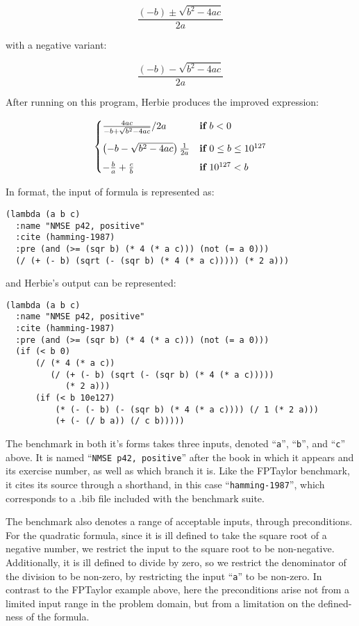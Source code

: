 \documentclass[main.tex]{subfiles}
\begin{document}
\begin{equation}
  \frac{(- b) \pm \sqrt{b^2 - 4ac}}{2a}
\end{equation}

with a negative variant:

\begin{equation}
  \frac{(- b) - \sqrt{b^2 - 4ac}}{2a}
\end{equation}

After running on this program, Herbie produces the improved
expression:

\newcommand{\K}[1]{\ensuremath{\mathbf{#1}}\relax\ifmmode\:\else\fi}

\[
\begin{cases}
  \frac{4ac}{-b + \sqrt{b^2 - 4ac}}/2a & \K{if} b < 0 \\[9pt]
  \left(-b - \sqrt{b^2 - 4ac}\right)\frac1{2a} & \K{if} 0 \le b \le 10^{127} \\[5pt]
  -\frac{b}{a} + \frac{c}{b} & \K{if} 10^{127} < b
\end{cases}
\]

In \core format, the input of formula is represented as:

\begin{verbatim}
(lambda (a b c)
  :name "NMSE p42, positive"
  :cite (hamming-1987)
  :pre (and (>= (sqr b) (* 4 (* a c))) (not (= a 0)))
  (/ (+ (- b) (sqrt (- (sqr b) (* 4 (* a c))))) (* 2 a)))
\end{verbatim}

and Herbie's output can be represented:

\begin{verbatim}
(lambda (a b c)
  :name "NMSE p42, positive"
  :cite (hamming-1987)
  :pre (and (>= (sqr b) (* 4 (* a c))) (not (= a 0)))
  (if (< b 0)
      (/ (* 4 (* a c))
         (/ (+ (- b) (sqrt (- (sqr b) (* 4 (* a c)))))
            (* 2 a)))
      (if (< b 10e127)
          (* (- (- b) (- (sqr b) (* 4 (* a c)))) (/ 1 (* 2 a)))
          (+ (- (/ b a)) (/ c b)))))
\end{verbatim}

The benchmark in both it's forms takes three inputs, denoted
``\verb|a|'', ``\verb|b|'', and ``\verb|c|'' above. It is named
``\verb|NMSE p42, positive|'' after the book in which it appears and
its exercise number, as well as which branch it is. Like the FPTaylor
benchmark, it cites its source through a shorthand, in this case
``\verb|hamming-1987|'', which corresponds to a .bib file included
with the benchmark suite.

The benchmark also denotes a range of acceptable inputs, through
preconditions. For the quadratic formula, since it is ill defined to
take the square root of a negative number, we restrict the input to
the square root to be non-negative. Additionally, it is ill defined to
divide by zero, so we restrict the denominator of the division to be
non-zero, by restricting the input ``\verb|a|'' to be non-zero. In
contrast to the FPTaylor example above, here the preconditions arise
not from a limited input range in the problem domain, but from a
limitation on the defined-ness of the formula.
\end{document}
